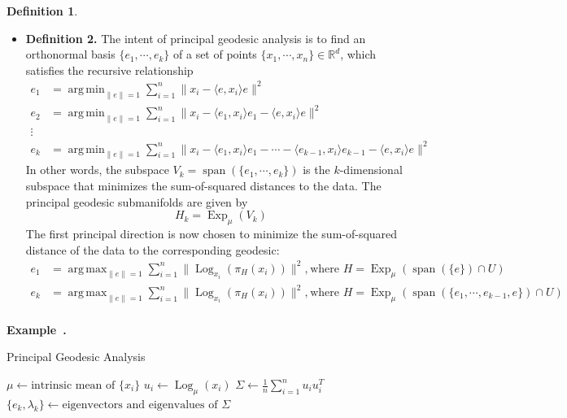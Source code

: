 \documentclass[a4paper]{article}
\theoremstyle{definition}
\newtheorem{definition}{Definition}
\theoremstyle{plain}
\newenvironment{example}[1][]{\refstepcounter{example}\par\medskip
   \noindent \textbf{Example~\theexample. #1} \rmfamily}{\medskip}
\newcounter{example}{Example}
\DeclareMathOperator*{\argmin}{arg\,min}
\DeclareMathOperator*{\argmax}{arg\,max}
\begin{document}
\begin{definition}
\begin{itemize}
    \item \textbf{Definition 2.} The intent of principal geodesic analysis is to find an orthonormal basis $\{e_1,\cdots,e_k\}$ of a set of points $\{x_1,\cdots,x_n\}\in\mathbb{R}^d$, which satisfies the recursive relationship
    \begin{align*}
        e_1&=\argmin_{\|e\|=1}\sum^n_{i=1}\|x_i-\langle e,x_i\rangle e\|^2\\
        e_2&=\argmin_{\|e\|=1}\sum^n_{i=1}\|x_i-\langle e_1,x_i\rangle e_1-\langle e,x_i\rangle e\|^2\\
        \vdots\\
        e_k&=\argmin_{\|e\|=1}\sum^n_{i=1}\|x_i-\langle e_1,x_i\rangle e_1-\cdots-\langle e_{k-1},x_i\rangle e_{k-1}-\langle e,x_i\rangle e\|^2
    \end{align*}
    In other words, the subspace $V_k=\operatorname{span}(\{e_1,\cdots,e_k\})$ is the $k$-dimensional subspace that minimizes the sum-of-squared distances to the data.
    The principal geodesic submanifolds are given by 
    \begin{equation*}
        H_k=\operatorname{Exp}_\mu(V_k)
    \end{equation*}
    The first principal direction is now chosen to minimize the sum-of-squared distance of the data to the corresponding geodesic:
    \begin{align*}
        e_1&=\argmax_{\|e\|=1}\sum^n_{i=1}\|\operatorname{Log}_{x_i}(\pi_H(x_i))\|^2, &&\text{where } H=\operatorname{Exp}_\mu(\operatorname{span}(\{e\})\cap U)\\
        e_k&=\argmax_{\|e\|=1}\sum^n_{i=1}\|\operatorname{Log}_{x_i}(\pi_H(x_i))\|^2, &&\text{where } H=\operatorname{Exp}_\mu(\operatorname{span}(\{e_1,\cdots,e_{k-1},e\})\cap U)\\
    \end{align*}
\end{itemize}
\end{definition}

\begin{example}
\begin{algorithm}[H]
\caption{Principal Geodesic Analysis}\label{algoKM}
    \begin{algorithmic}
        \State $\mu\leftarrow\text{intrinsic mean of }\{x_i\}$
        \State $u_i\leftarrow\operatorname{Log}_\mu(x_i)$
        \State $\Sigma\leftarrow \frac{1}{n}\sum^n_{i=1}u_iu_i^T$
        \State $\{e_k,\lambda_k\}\leftarrow \text{eigenvectors and eigenvalues of }\Sigma$
        \State {}
    \end{algorithmic}
\end{algorithm} 
\end{example}
\end{document}
